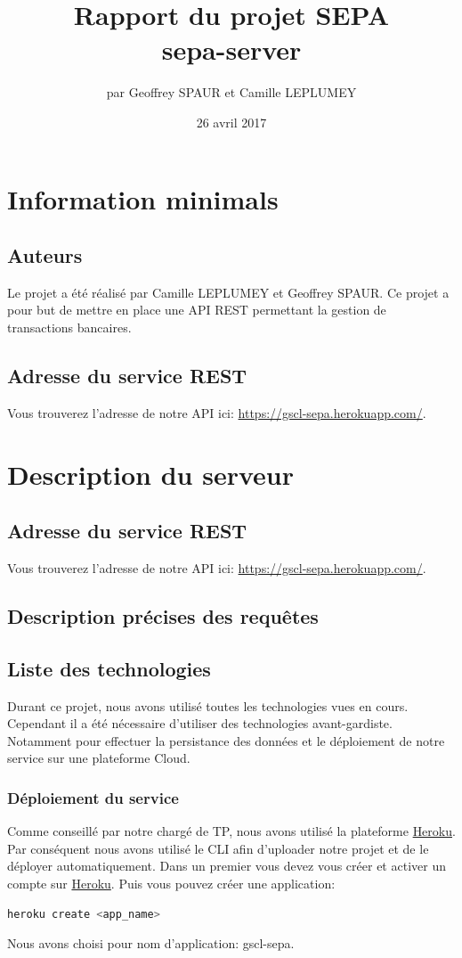 \documentclass{article}
\title{Rapport du projet SEPA \\ sepa-server}
\author{par Geoffrey SPAUR et Camille LEPLUMEY}
\date{26 avril 2017}
\begin{document}
\maketitle
\newpage
\tableofcontents{}
\newpage
\section{Information minimals}
\subsection{Auteurs}
Le projet a été réalisé par Camille LEPLUMEY et Geoffrey SPAUR. Ce projet a pour but de mettre en place une API REST 
permettant la gestion de transactions bancaires.
\subsection{Adresse du service REST}
Vous trouverez l’adresse de notre API ici: \url{https://gscl-sepa.herokuapp.com/}.
\newpage

\section{Description du serveur}
\subsection{Adresse du service REST}
Vous trouverez l’adresse de notre API ici: \url{https://gscl-sepa.herokuapp.com/}.
\subsection{Description précises des requêtes}
\subsection{Liste des technologies}
Durant ce projet, nous avons utilisé toutes les technologies vues en cours. Cependant il a été nécessaire 
d'utiliser des technologies avant-gardiste.
Notamment pour effectuer la persistance des données et le déploiement de notre service sur une plateforme Cloud.
\subsubsection{Déploiement du service}
Comme conseillé par notre chargé de TP, nous avons utilisé la plateforme \href{https://www.heroku.com}{Heroku}.
Par conséquent nous avons utilisé le CLI afin d'uploader notre projet et de le déployer automatiquement.
Dans un premier vous devez vous créer et activer un compte sur \href{https://www.heroku.com}{Heroku}. Puis vous pouvez créer une application:
\begin{lstlisting}[language=bash]
heroku create <app_name>
\end{lstlisting}
Nous avons choisi pour nom d'application: gscl-sepa.
\end{document}
